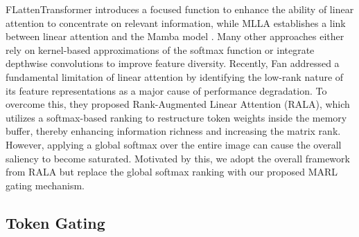 

FLattenTransformer \cite{han2023flatten} introduces a focused function to enhance the ability of linear attention to concentrate on relevant information, while MLLA \cite{han2024demystify} establishes a link between linear attention and the Mamba model \cite{gu2024mamba}.
Many other approaches either rely on kernel-based approximations of the softmax function or integrate depthwise convolutions to improve feature diversity. Recently, Fan \etal \cite{fan2025breaking} addressed a fundamental limitation of linear attention by identifying the low-rank nature of its feature representations as a major cause of performance degradation. To overcome this, they proposed Rank-Augmented Linear Attention (RALA), which utilizes a softmax-based ranking to restructure token weights inside the memory buffer, thereby enhancing information richness and increasing the matrix rank. However, applying a global softmax over the entire image can cause the overall saliency to become saturated. Motivated by this, we adopt the overall framework from RALA but replace the global softmax ranking with our proposed MARL gating mechanism.
\subsection{Token Gating}

